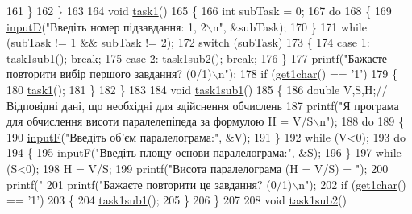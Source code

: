\begin{DoxyCodeInclude}
{{{{161     \}
162 \}
163 
164 \textcolor{keywordtype}{void} \hyperlink{main_8c_afde07648040c326129670547738a0c86}{task1}()
165 \{
166     \textcolor{keywordtype}{int} subTask = 0;
167     \textcolor{keywordflow}{do}
168     \{
169         \hyperlink{main_8c_aa9f623385e5c1c8ac44a985d44cf3c5a}{inputD}(\textcolor{stringliteral}{"Введіть номер підзавдання: 1, 2\(\backslash\)n"}, &subTask);
170     \}
171     \textcolor{keywordflow}{while} (subTask != 1 && subTask != 2);
172     \textcolor{keywordflow}{switch} (subTask)
173     \{
174         \textcolor{keywordflow}{case} 1: \hyperlink{main_8c_ad0ae7d23ef39095cda907019fd94ed96}{task1sub1}(); \textcolor{keywordflow}{break};
175         \textcolor{keywordflow}{case} 2: \hyperlink{main_8c_ab6b6fe73040966990d9129dbf55cb110}{task1sub2}(); \textcolor{keywordflow}{break};
176     \}
177     printf(\textcolor{stringliteral}{"Бажаєте повторити вибір першого завдання? (0/1)\(\backslash\)n"});
178     \textcolor{keywordflow}{if} (\hyperlink{main_8c_a20531ce01d5668d3c0eafb037eb3c514}{get1char}() == \textcolor{charliteral}{'1'})
179     \{
180         \hyperlink{main_8c_afde07648040c326129670547738a0c86}{task1}();
181     \}
182 \}
183 
184 \textcolor{keywordtype}{void} \hyperlink{main_8c_ad0ae7d23ef39095cda907019fd94ed96}{task1sub1}()
185 \{
186     \textcolor{keywordtype}{double} V,S,H;\textcolor{comment}{//Відповідні дані, що необхідні для здійснення обчислень}
187     printf(\textcolor{stringliteral}{"Я програма для обчислення висоти паралелепіпеда за формулою H = V/S\(\backslash\)n"});
188     \textcolor{keywordflow}{do}
189     \{
190         \hyperlink{main_8c_a67a83febb2bdcd536c9edefe419afb2e}{inputF}(\textcolor{stringliteral}{"Введіть об'єм паралелограма:"}, &V);
191     \}
192     \textcolor{keywordflow}{while} (V<0);
193     \textcolor{keywordflow}{do}
194     \{
195         \hyperlink{main_8c_a67a83febb2bdcd536c9edefe419afb2e}{inputF}(\textcolor{stringliteral}{"Введіть площу основи паралелограма:"}, &S);
196     \}
197     \textcolor{keywordflow}{while} (S<0);
198     H = V/S;
199     printf(\textcolor{stringliteral}{"Висота паралелограма (H = V/S) = "});
200     printf(\textcolor{stringliteral}{"%
201     printf(\textcolor{stringliteral}{"Бажаєте повторити це завдання? (0/1)\(\backslash\)n"});
202     \textcolor{keywordflow}{if} (\hyperlink{main_8c_a20531ce01d5668d3c0eafb037eb3c514}{get1char}() == \textcolor{charliteral}{'1'})
203     \{
204         \hyperlink{main_8c_ad0ae7d23ef39095cda907019fd94ed96}{task1sub1}();
205     \}
206 \}
207 
208 \textcolor{keywordtype}{void} \hyperlink{main_8c_ab6b6fe73040966990d9129dbf55cb110}{task1sub2}()
}}}}}
\end{DoxyCodeInclude}
